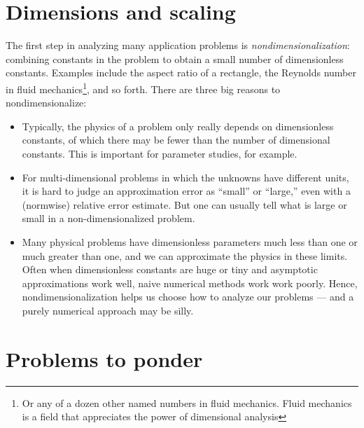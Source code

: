 \documentclass[12pt, leqno]{article}
\begin{document}
\section*{Dimensions and scaling}

The first step in analyzing many application problems is
{\em nondimensionalization}: combining constants in the
problem to obtain a small number of dimensionless constants.
Examples include the aspect ratio of a rectangle,
the Reynolds number in fluid mechanics\footnote{%
Or any of a dozen other named numbers in fluid mechanics.  Fluid
mechanics is a field that appreciates the power of dimensional
analysis}, and so forth.  There are three big reasons to
nondimensionalize:
\begin{itemize}
\item
  Typically, the physics of a problem only really depends on
  dimensionless constants, of which there may be fewer than
  the number of dimensional constants.  This is important
  for parameter studies, for example.
\item
  For multi-dimensional problems in which the unknowns have different
  units, it is hard to judge an approximation error as ``small'' or
  ``large,'' even with a (normwise) relative error estimate.  But one
  can usually tell what is large or small in a non-dimensionalized
  problem.
\item
  Many physical problems have dimensionless parameters much less than
  one or much greater than one, and we can approximate the physics in
  these limits.  Often when dimensionless constants are huge or tiny
  and asymptotic approximations work well, naive numerical methods
  work work poorly.  Hence, nondimensionalization helps us choose how
  to analyze our problems --- and a purely numerical approach may be
  silly.
\end{itemize}

\section*{Problems to ponder}
\end{document}
